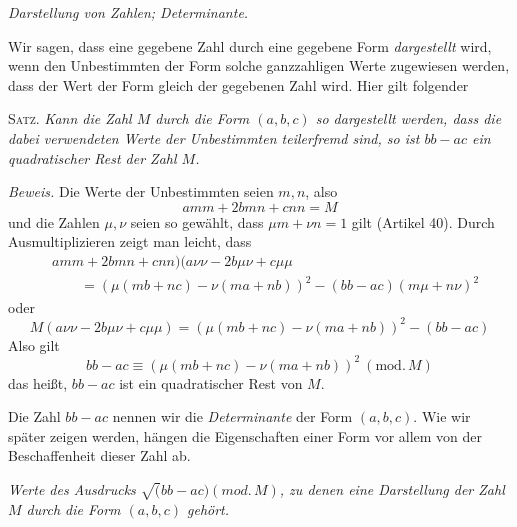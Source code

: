 \begin{center}
\textit{Darstellung von Zahlen; Determinante.}
\end{center}

Wir sagen, dass eine gegebene Zahl durch eine gegebene Form \textit{dargestellt} wird, wenn den Unbestimmten der Form solche ganzzahligen Werte zugewiesen werden, dass der Wert der Form gleich der gegebenen Zahl wird. Hier gilt folgender

\textsc{Satz.} \textit{Kann die Zahl $M$ durch die Form $(a,b,c)$ so dargestellt werden, dass die dabei verwendeten Werte der Unbestimmten teilerfremd sind, so ist $bb-ac$ ein quadratischer Rest der Zahl $M$.}

\textit{Beweis.} Die Werte der Unbestimmten seien $m,n$, also
\[
amm+2bmn+cnn=M
\]
und die Zahlen $\mu,\nu$ seien so gewählt, dass $\mu m+\nu n=1$ gilt (Artikel 40). Durch Ausmultiplizieren zeigt man leicht, dass
\[
\begin{aligned}
&amm+2bmn+cnn)(a\nu\nu-2b\mu\nu+c\mu\mu\\
&\qquad={}(\mu(mb+nc)-\nu(ma+nb))^2-(bb-ac)(m\mu+n\nu)^2
\end{aligned}
\]
oder
\[
M(a\nu\nu-2b\mu\nu+c\mu\mu)=(\mu(mb+nc)-\nu(ma+nb))^2-(bb-ac)
\]
Also gilt
\[
bb-ac\equiv(\mu(mb+nc)-\nu(ma+nb))^2\ (\mathrm{mod.}\,M)
\]
das heißt, $bb-ac$ ist ein quadratischer Rest von $M$.

Die Zahl $bb-ac$ nennen wir die \textit{Determinante} der Form $(a,b,c)$. Wie wir später zeigen werden, hängen die Eigenschaften einer Form vor allem von der Beschaffenheit dieser Zahl ab.

\begin{center}
\textit{Werte des Ausdrucks $\surd(bb-ac)(\mathit{mod.}\,M)$, zu denen eine Darstellung der Zahl $M$ durch die Form $(a,b,c)$ gehört.}
\end{center}

